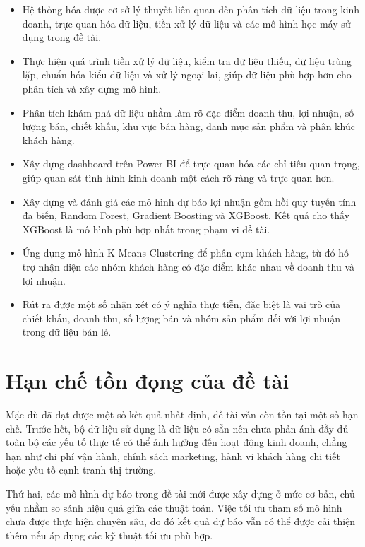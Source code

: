 \begin{itemize}
	\item Hệ thống hóa được cơ sở lý thuyết liên quan đến phân tích dữ liệu trong kinh doanh, trực quan hóa dữ liệu, tiền xử lý dữ liệu và các mô hình học máy sử dụng trong đề tài.
	
	\item Thực hiện quá trình tiền xử lý dữ liệu, kiểm tra dữ liệu thiếu, dữ liệu trùng lặp, chuẩn hóa kiểu dữ liệu và xử lý ngoại lai, giúp dữ liệu phù hợp hơn cho phân tích và xây dựng mô hình.
	
	\item Phân tích khám phá dữ liệu nhằm làm rõ đặc điểm doanh thu, lợi nhuận, số lượng bán, chiết khấu, khu vực bán hàng, danh mục sản phẩm và phân khúc khách hàng.
	
	\item Xây dựng dashboard trên Power BI để trực quan hóa các chỉ tiêu quan trọng, giúp quan sát tình hình kinh doanh một cách rõ ràng và trực quan hơn.
	
	\item Xây dựng và đánh giá các mô hình dự báo lợi nhuận gồm hồi quy tuyến tính đa biến, Random Forest, Gradient Boosting và XGBoost. Kết quả cho thấy XGBoost là mô hình phù hợp nhất trong phạm vi đề tài.
	
	\item Ứng dụng mô hình K-Means Clustering để phân cụm khách hàng, từ đó hỗ trợ nhận diện các nhóm khách hàng có đặc điểm khác nhau về doanh thu và lợi nhuận.
	
	\item Rút ra được một số nhận xét có ý nghĩa thực tiễn, đặc biệt là vai trò của chiết khấu, doanh thu, số lượng bán và nhóm sản phẩm đối với lợi nhuận trong dữ liệu bán lẻ.
\end{itemize}

\section{Hạn chế tồn đọng của đề tài}

Mặc dù đã đạt được một số kết quả nhất định, đề tài vẫn còn tồn tại một số hạn chế. Trước hết, bộ dữ liệu sử dụng là dữ liệu có sẵn nên chưa phản ánh đầy đủ toàn bộ các yếu tố thực tế có thể ảnh hưởng đến hoạt động kinh doanh, chẳng hạn như chi phí vận hành, chính sách marketing, hành vi khách hàng chi tiết hoặc yếu tố cạnh tranh thị trường.

Thứ hai, các mô hình dự báo trong đề tài mới được xây dựng ở mức cơ bản, chủ yếu nhằm so sánh hiệu quả giữa các thuật toán. Việc tối ưu tham số mô hình chưa được thực hiện chuyên sâu, do đó kết quả dự báo vẫn có thể được cải thiện thêm nếu áp dụng các kỹ thuật tối ưu phù hợp.

